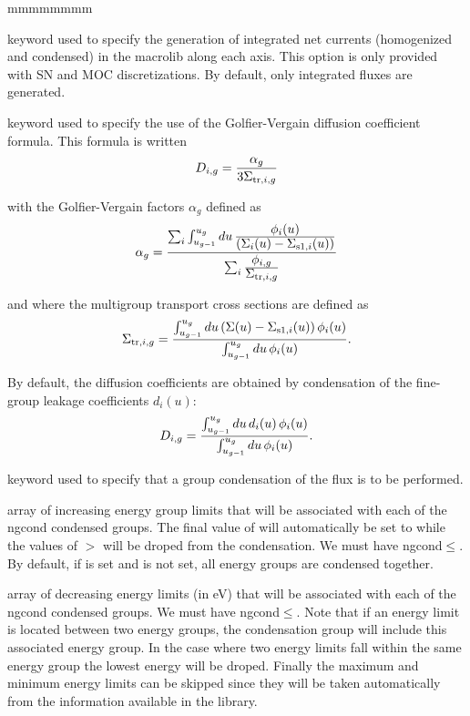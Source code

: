 \begin{ListeDeDescription}{mmmmmmmm}
\item[\moc{EDI\_CURR}] keyword used to specify the generation of integrated net currents (homogenized and condensed) in the macrolib along each axis.
This option is only provided with SN and MOC discretizations. By default, only integrated fluxes are generated.

\item[\moc{GOLVER}] keyword used to specify the use of the Golfier-Vergain diffusion coefficient formula. This formula is written
$$D_{i,g}={\alpha_g\over 3\Sigma_{{\rm tr},i,g}}$$

\noindent with the Golfier-Vergain factors $\alpha_g$ defined as
$$\alpha_g={\sum_i  \int_{u_{g-1}}^{u_g} du \, {\displaystyle\phi_i(u) \over \displaystyle\left(\Sigma_i(u)-\Sigma_{{\rm s1},i}(u) \right) }
\over \sum_i {\displaystyle\phi_{i,g} \over \displaystyle\Sigma_{{\rm tr},i,g}} }$$

and where the multigroup transport cross sections are defined as
$$\Sigma_{{\rm tr},i,g}={\int_{u_{g-1}}^{u_g} du \left(\Sigma(u) -\Sigma_{{\rm s1},i}(u) \right) \phi_i(u)
\over \int_{u_{g-1}}^{u_g} du \, \phi_i(u) }.$$

By default, the diffusion coefficients are obtained by condensation of the fine-group leakage coefficients $d_i(u)$:
$$D_{i,g}={\int_{u_{g-1}}^{u_g} du \, d_i(u) \, \phi_i(u) \over \int_{u_{g-1}}^{u_g} du \, \phi_i(u) }.$$

\item[\moc{COND}] keyword used to specify that a group condensation of the flux is to be performed.

\item[\dusa{icond}] array of increasing energy group limits that will be associated with
each of the ngcond condensed groups. The final value of
 will automatically be set to  while the values of 
$>$ will be droped from the condensation. 
We must have ngcond$\le$. By default, if  is set and 
is not set, all energy groups are condensed together.

\item[\dusa{energy}] array of decreasing energy limits (in eV) that will be
associated with each of the ngcond condensed groups. We must have ngcond$\le$. 
Note that if an energy limit is located between two energy groups, the condensation
group will include this associated energy group. In the case where two energy
limits fall within the same energy group the lowest energy will be droped.
Finally the maximum and minimum energy limits can be skipped since they will be
taken automatically from the information available in the library.


\end{ListeDeDescription}
